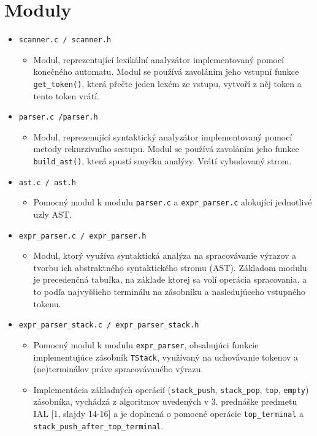 \section{Moduly}

\vspace{1.5em}
{ \large \raggedright
\begin{itemize}
    \item \verb|scanner.c / scanner.h|
    \begin{itemize}
        \item Modul, reprezentující lexikální analyzátor implementovaný pomocí konečného automatu. Modul se používá zavoláním jeho vstupní funkce \verb|get_token()|, která přečte jeden lexém ze vstupu, vytvoří z něj token a tento token vrátí.
    \end{itemize}
    \item \verb|parser.c /parser.h|
    \begin{itemize}
        \item Modul, reprezenující syntaktický analyzátor implementovaný pomocí metody rekurzivního sestupu. Modul se používá zavoláním jeho funkce \verb|build_ast()|, která spustí smyčku analýzy. Vrátí vybudovaný strom.
    \end{itemize}
    \item \verb|ast.c / ast.h|
    \begin{itemize}
        \item Pomocný modul k modulu \verb|parser.c| a \verb|expr_parser.c| alokující jednotlivé uzly AST.
    \end{itemize}
    \item \verb|expr_parser.c / expr_parser.h| 
    \begin{itemize}
        \item Modul, ktorý využíva syntaktická analýza na spracovávanie výrazov a tvorbu ich abstraktného syntaktického stromu (AST). Základom modulu je precedenčná tabuľka, na základe ktorej sa volí operácia spracovania, a to podľa najvyššieho terminálu na zásobníku a nasledujúceho vstupného tokenu.
    \end{itemize}
    \item \verb|expr_parser_stack.c / expr_parser_stack.h|
    \begin{itemize}
        \item Pomocný modul k modulu \verb|expr_parser|, obsahujúci funkcie implementujúce zásobník \verb|TStack|, využívaný na uchovávanie tokenov a (ne)terminálov práve spracovávaného výrazu.
        \item Implementácia základných operácií (\verb|stack_push|, \verb|stack_pop|, \verb|top|, \verb|empty|) zásobníka, vychádzá z algoritmov uvedených v 3. prednáške predmetu IAL [1, slajdy 14-16] a je doplnená o pomocné operácie \verb|top_terminal| a \verb|stack_push_after_top_terminal|.

\end{itemize}
\end{itemize}}
